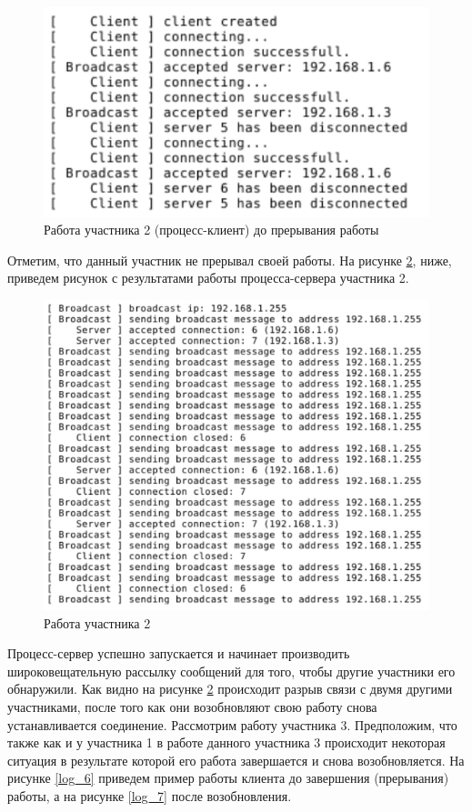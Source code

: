 \begin{figure}[!hbt]
    \centering
    \includegraphics{log_4}
    \caption{Работа участника 2 (процесс-клиент) до прерывания работы}\label{log_4}
\end{figure}
\newpar
Отметим, что данный участник не прерывал своей работы. На рисунке \ref{log_5},
ниже, приведем рисунок с результатами работы процесса-сервера участника 2.

\begin{figure}[!hbt]
    \centering
    \includegraphics[width=\textwidth]{log_5}
    \caption{Работа участника 2}\label{log_5}
\end{figure}
\newpar
Процесс-сервер успешно запускается и начинает производить
широковещательную рассылку сообщений для того, чтобы другие участники
его обнаружили. Как видно на рисунке \ref{log_5} происходит разрыв связи с двумя
другими участниками, после того как они возобновляют свою работу снова
устанавливается соединение.
\newpar
Рассмотрим работу участника 3. Предположим, что также как и у участника 1
в работе данного участника 3 происходит некоторая ситуация в результате
которой его работа завершается и снова возобновляется. На рисунке \ref{log_6}
приведем пример работы клиента до завершения (прерывания) работы, а на
рисунке \ref{log_7} после возобновления.

